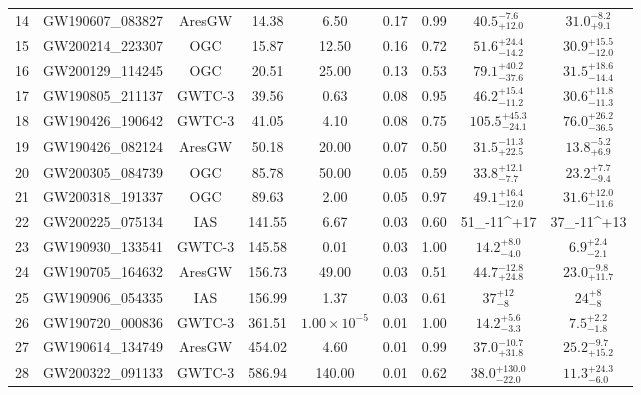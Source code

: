 \begin{table*}[ht]
\begin{tabular}{!{\vrule width 1pt}lcccccccc!{\vrule width 1pt}}
14 & GW190607\_083827 & AresGW & 14.38 & 6.50 & 0.17 & 0.99 & $40.5_{+12.0}^{-7.6}$ & $31.0_{+9.1}^{-8.2}$ \\
15 & GW200214\_223307 & OGC & 15.87 & 12.50 & 0.16 & 0.72 & $51.6^{+24.4}_{-14.2}$ & $30.9^{+15.5}_{-12.0}$ \\
16 & GW200129\_114245 & OGC & 20.51 & 25.00 & 0.13 & 0.53 & $79.1^{+40.2}_{-37.6}$ & $31.5^{+18.6}_{-14.4}$ \\
17 & GW190805\_211137 & GWTC-3 & 39.56 & 0.63 & 0.08 & 0.95 & $46.2^{+15.4}_{-11.2}$ & $30.6^{+11.8}_{-11.3}$ \\
18 & GW190426\_190642 & GWTC-3 & 41.05 & 4.10 & 0.08 & 0.75 & $105.5^{+45.3}_{-24.1}$ & $76.0^{+26.2}_{-36.5}$ \\
19 & GW190426\_082124 & AresGW & 50.18 & 20.00 & 0.07 & 0.50 & $31.5_{+22.5}^{-11.3}$ & $13.8_{+6.9}^{-5.2}$ \\
20 & GW200305\_084739 & OGC & 85.78 & 50.00 & 0.05 & 0.59 & $33.8^{+12.1}_{-7.7}$ & $23.2^{+7.7}_{-9.4}$ \\
21 & GW200318\_191337 & OGC & 89.63 & 2.00 & 0.05 & 0.97 & $49.1^{+16.4}_{-12.0}$ & $31.6^{+12.0}_{-11.6}$ \\
22 & GW200225\_075134 & IAS & 141.55 & 6.67 & 0.03 & 0.60 & 51_{-11}^{+17} & 37_{-11}^{+13} \\
23 & GW190930\_133541 & GWTC-3 & 145.58 & 0.01 & 0.03 & 1.00 & $14.2^{+8.0}_{-4.0}$ & $6.9^{+2.4}_{-2.1}$ \\
24 & GW190705\_164632 & AresGW & 156.73 & 49.00 & 0.03 & 0.51 & $44.7_{+24.8}^{-12.8}$ & $23.0_{+11.7}^{-9.8}$ \\
25 & GW190906\_054335 & IAS & 156.99 & 1.37 & 0.03 & 0.61 & $37_{-8}^{+12}$ & $24_{-8}^{+8}$ \\
26 & GW190720\_000836 & GWTC-3 & 361.51 & $1.00 \times 10^{-5}$ & 0.01 & 1.00 & $14.2^{+5.6}_{-3.3}$ & $7.5^{+2.2}_{-1.8}$ \\
27 & GW190614\_134749 & AresGW & 454.02 & 4.60 & 0.01 & 0.99 & $37.0_{+31.8}^{-10.7}$ & $25.2_{+15.2}^{-9.7}$ \\
28 & GW200322\_091133 & GWTC-3 & 586.94 & 140.00 & 0.01 & 0.62 & $38.0^{+130.0}_{-22.0}$ & $11.3^{+24.3}_{-6.0}$ \\
\bottomrule[1pt]
\end{tabular}

\end{table*}
